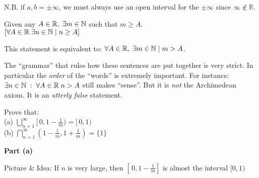 \documentclass[twoside]{scrartcl}
\begin{document}
N.B. if $a,b = \pm \infty$, we must always use an open interval for the $\pm \infty$ since $\infty \notin \mathbb{R}$.


\vspace*{10pt}

\begin{axiom}[Archimedean]
Given any  $A \in \mathbb{R}, \; \exists m \in \mathbb{N}$ such that $m \geq A$.\\ $ [\forall A \in \mathbb{R} \; \exists n \in \mathbb{N} \;|\; n \geq A]$ 
\end{axiom}



This statement is equivalent to: $\forall A \in \mathbb{R}, \; \exists m \in \mathbb{N} \; | \; m > A$. 

The ``grammar'' that rules how these sentences are put together is very strict. In particular the \emph{order} of the ``words'' is extremely important. For instance: $\exists n \in \mathbb{N} \; : \; \forall A \in \mathbb{R} \; n > A$ still makes ``sense''. But it is \emph{not} the Archimedean axiom. It is an \emph{utterly false} statement.\\

\begin{example} Prove that:\\

(a) ${\bigcup_{n=1}^{\infty} [\,0, 1-\frac{1}{m}) = [\,0,1)}$ \\

(b) ${\bigcap_{n=1}^{\infty} (1-\frac{1}{m}, 1+ \frac{1}{m}) = \{1\}}$ \\ 

\end{example}

\textbf{Part (a)} 

Picture \& Idea: If $n$ is very large, then $[\,0, 1-\frac{1}{m}]$ is almost the interval $[0,1)$\\
\\
\hspace*{60pt}
\end{document}
